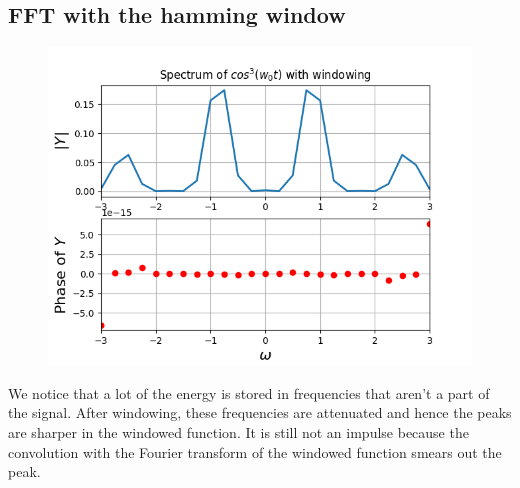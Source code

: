 \documentclass{article}
\begin{document}
\subsection{FFT with the hamming window}
\begin{figure}[h!]
\centering
\includegraphics[scale=0.5]{Figure_9.png}
\label{fig:universe}
\end{figure}

We notice that a lot of the energy is stored in frequencies that aren't a part of the signal. After windowing, these frequencies are attenuated and hence the peaks are sharper in the windowed function. It is still not an impulse because the convolution with the Fourier transform of the windowed function smears out the peak.
\end{document}
